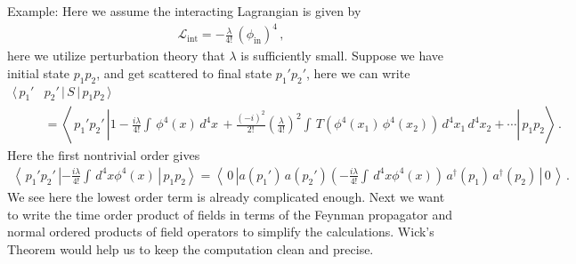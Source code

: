 \documentclass[11pt, onesided]{book}
\theoremstyle{break}
\theoremstyle{break}
\newcommand{\example}{\color{green}Example: \color{black}}
\begin{document}
\example Here we assume the interacting Lagrangian is given by
\begin{align}
\mathcal{L}_{\text{int}} = -\frac{\lambda}{4!}\, (\phi_{\text{in}})^4\,,
\end{align}
here we utilize perturbation theory that $\lambda$ is sufficiently small. Suppose we have initial state $p_1p_2$, and get scattered to final state $p_1'p_2'$, here we can write
\begin{align*}
\langle\, p_1'&p_2'\, |\, S\, |\, p_1p_2\,\rangle \\
&= \left\langle\, p_1'p_2'\, \left| 1- \frac{i\lambda}{4!}\int  \, \phi^4(x) \, d^4x\, + \frac{(-i)^2}{2!}\left( \frac{\lambda}{4!}\right)^2 \int \, T\left(\phi^4(x_1)\, \phi^4(x_2)\right) \, d^4x_1\, d^4x_2 + \cdots \right|\, p_1p_2\right\rangle\,.
\end{align*}
Here the first nontrivial order gives
\begin{align*}
\left\langle\, p_1'p_2'\,\left| -\frac{i\lambda}{4!}\int \, d^4x \phi^4(x) \,\right|\,p_1p_2\right\rangle = \left\langle \, 0 \, \left| a(p_1')\,a(p_2') \left(-\frac{i\lambda}{4!}\int \, d^4x \phi^4(x)  \right)\, a^{\dagger}(p_1)\, a^{\dagger}(p_2)\,\right|\,0\,\right\rangle\,.
\end{align*}
We see here the lowest order term is already complicated enough. Next we want to write the time order product of fields in terms of the Feynman propagator and normal ordered products of field operators to simplify the calculations. Wick's Theorem would help us to keep the computation clean and precise.
\end{document}
